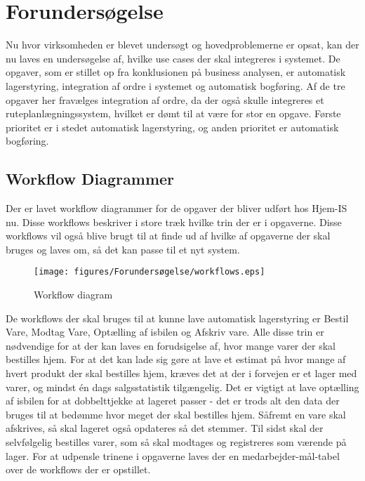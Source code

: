 \chapter{Forundersøgelse}\label{ch:forundersoegelse}
Nu hvor virksomheden er blevet undersøgt og hovedproblemerne er opsat, kan der nu laves en undersøgelse af, hvilke use cases der skal integreres i systemet. De opgaver, som er stillet op fra konklusionen på business analysen, er automatisk lagerstyring, integration af ordre i systemet og automatisk bogføring. Af de tre opgaver her fravælges integration af ordre, da der også skulle integreres et ruteplanlægningssystem, hvilket er dømt til at være for stor en opgave. Første prioritet er i stedet automatisk lagerstyring, og anden prioritet er automatisk bogføring.

\section{Workflow Diagrammer}
Der er lavet workflow diagrammer for de opgaver der bliver udført hos Hjem-IS nu. Disse workflows beskriver i store træk hvilke trin der er i opgaverne. Disse workflows vil også blive brugt til at finde ud af hvilke af opgaverne der skal bruges og laves om, så det kan passe til et nyt system. 

\begin{figure}[H]
    \centering
    \texttt{[image: figures/Forundersøgelse/workflows.eps]}
    \caption{Workflow diagram}
    \label{fig:workflows}
\end{figure}
De workflows der skal bruges til at kunne lave automatisk lagerstyring er Bestil Vare, Modtag Vare, Optælling af isbilen og Afskriv vare. Alle disse trin er nødvendige for at der kan laves en forudsigelse af, hvor mange varer der skal bestilles hjem. For at det kan lade sig gøre at lave et estimat på hvor mange af hvert produkt der skal bestilles hjem, kræves det at der i forvejen er et lager med varer, og mindst én dags salgsstatistik tilgængelig. Det er vigtigt at lave optælling af isbilen for at dobbelttjekke at lageret passer - det er trods alt den data der bruges til at bedømme hvor meget der skal bestilles hjem. Såfremt en vare skal afskrives, så skal lageret også opdateres så det stemmer. Til sidst skal der selvfølgelig bestilles varer, som så skal modtages og registreres som værende på lager. For at udpensle trinene i opgaverne laves der en medarbejder-mål-tabel over de workflows der er opstillet.


